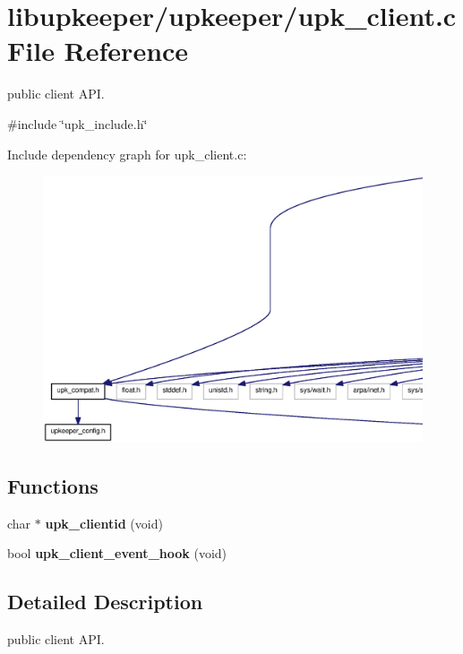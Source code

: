 \section{libupkeeper/upkeeper/upk\_\-client.c File Reference}
\label{upk__client_8c}


public client API.  


{\ttfamily \#include \char`\"{}upk\_\-include.h\char`\"{}}\par
Include dependency graph for upk\_\-client.c:\nopagebreak
\begin{figure}[H]
\begin{center}
\leavevmode
\includegraphics[width=400pt]{upk__client_8c__incl}
\end{center}
\end{figure}
\subsection*{Functions}
\begin{DoxyCompactItemize}
\item 
char $\ast$ {\bf upk\_\-clientid} (void)
\item 
bool {\bf upk\_\-client\_\-event\_\-hook} (void)
\end{DoxyCompactItemize}


\subsection{Detailed Description}
public client API. 